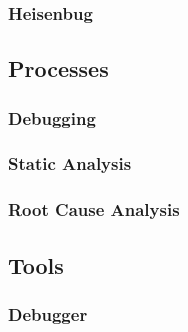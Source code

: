 \subsubsection{Heisenbug}

\subsection{Processes}

\subsubsection{Debugging}
\subsubsection{Static Analysis}
\subsubsection{Root Cause Analysis}

\subsection{Tools}
\subsubsection{Debugger}
